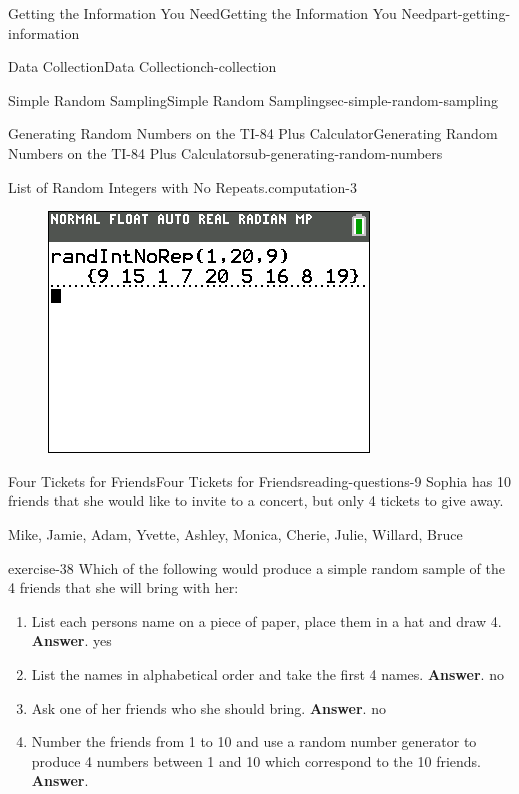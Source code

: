\documentclass[oneside,10pt,]{book}
\newcommand{\mono}[1]{\texttt{#1}}
\numberwithin{equation}{section}
\newenvironment{codedisplay}
{\VerbatimEnvironment\begin{center}\begin{lrbox}{\codedisplaybox}\begin{BVerbatim}}
{\end{BVerbatim}\end{lrbox}\usebox{\codedisplaybox}\end{center}}
\begin{document}
\begin{partptx}{Getting the Information You Need}{}{Getting the Information You Need}{}{}{part-getting-information}
\begin{chapterptx}{Data Collection}{}{Data Collection}{}{}{ch-collection}
\begin{sectionptx}{Simple Random Sampling}{}{Simple Random Sampling}{}{}{sec-simple-random-sampling}
\begin{subsectionptx}{Generating Random Numbers on the TI-84 Plus Calculator}{}{Generating Random Numbers on the TI-84 Plus Calculator}{}{}{sub-generating-random-numbers}
\begin{computation}{List of Random Integers with No Repeats.}{computation-3}
%
\begin{figure}\centering\includegraphics[width=0.4\linewidth]{images/randIntNoRep.png}
\end{figure}\end{computation}
\end{subsectionptx}
%
%
\typeout{************************************************}
\typeout{************************************************}
%
\begin{reading-questions-subsection}{Four Tickets for Friends}{}{Four Tickets for Friends}{}{}{reading-questions-9}
\hypertarget{p-13}{}%
Sophia has 10 friends that she would like to invite to a concert, but only 4 tickets to give away.%
\par
\hypertarget{p-14}{}%
Mike, Jamie, Adam, Yvette, Ashley, Monica, Cherie, Julie, Willard, Bruce%
\begin{divisionexercise}{1}{}{}{exercise-38}%
Which of the following would produce a simple random sample of the 4 friends that she will bring with her: \leavevmode%
\begin{enumerate}[label=(\alph*)]
\item\hypertarget{li-13}{}List each persons name on a piece of paper, place them in a hat and draw 4. \textbf{Answer}.\quad%
yes%
\item\hypertarget{li-14}{}List the names in alphabetical order and take the first 4 names. \textbf{Answer}.\quad%
no%
\item\hypertarget{li-15}{}Ask one of her friends who she should bring. \textbf{Answer}.\quad%
no%
\item\hypertarget{li-16}{}Number the friends from 1 to 10 and use a random number generator to produce 4 numbers between 1 and 10 which correspond to the 10 friends. \textbf{Answer}.\quad%

\end{enumerate}
\end{divisionexercise}
\end{reading-questions-subsection}
\end{sectionptx}
\end{chapterptx}
\end{partptx}
\end{document}

